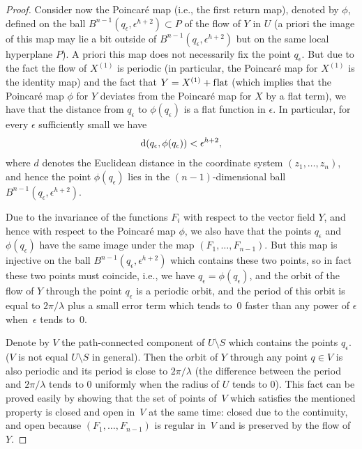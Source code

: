 \documentclass[pdftex]{sigma}
\numberwithin{equation}{section}
\begin{document}
\begin{proof}
Consider now the Poincar\'e map (i.e., the f\/irst return map), denoted by $\phi$,
def\/ined on the ball $B^{n-1}(q_\epsilon, \epsilon^{h+2}) \subset P$
of the f\/low of $Y$ in $U$
(a priori the image of this map may lie a bit outside of
$B^{n-1}(q_\epsilon, \epsilon^{h+2})$ but on the same
local hyperplane $P$). A priori this map does not necessarily f\/ix
the point $q_\epsilon$. But due to the fact the f\/low of $X^{(1)}$ is
periodic (in particular, the Poincar\'e map for $X^{(1)}$ is the identity map)
and the fact that $Y = X^{(1)} + \text{f\/lat}$ (which implies that the
Poincar\'e map $\phi$ for $Y$ deviates from the Poincar\'e map for $X$ by a
f\/lat term), we have that the distance from $q_\epsilon$ to
$\phi(q_\epsilon)$ is a f\/lat function in $\epsilon$. In particular,
for every $\epsilon$ suf\/f\/iciently small we have
\begin{gather*}
{\rm d}(q_\epsilon , \phi(q_\epsilon)) < \epsilon^{h+2},\end{gather*}
where $d$ denotes the Euclidean distance in the coordinate system $(z_1,\dots, z_n)$, and hence the point
$\phi(q_\epsilon)$ lies in the
$(n-1)$-dimensional ball $B^{n-1}(q_\epsilon, \epsilon^{h+2})$.

Due to the invariance of the functions $F_i$ with respect to
the vector f\/ield $Y$,
and hence with respect to the Poincar\'e map $\phi$, we also have that
the points $q_\epsilon$ and $\phi(q_\epsilon)$ have the same image
under the map $(F_1,\dots,F_{n-1})$. But this map is injective on the ball $B^{n-1}(q_\epsilon, \epsilon^{h+2})$
which contains these two points, so in fact these two points must coincide,
i.e., we have $q_\epsilon = \phi(q_\epsilon)$,
and the orbit of the f\/low of $Y$ through the point $q_\epsilon$ is a periodic orbit, and the period of this orbit
is equal to $2\pi/\lambda$ plus a small error term which tends to~0 faster
than any power of $\epsilon$ when~$\epsilon$ tends to~0.

Denote by $V$ the path-connected component of $U \setminus S$ which contains the points $q_\epsilon$. ($V$ is not equal $U \setminus S$ in general). Then
the orbit of $Y$ through any point $q \in V$ is also periodic and its period is close to $2\pi/\lambda$
(the dif\/ference between the period and $2\pi/\lambda$ tends to 0 uniformly when the radius of $U$ tends to 0). This
fact can be proved easily by showing that the set of points of~$V$ which satisf\/ies the mentioned property is closed
and open in~$V$ at the same time: closed due to the continuity, and open because $(F_1,\dots,F_{n-1})$
is regular in~$V$ and is preserved by the f\/low of~$Y$.


\end{proof}
\end{document}
